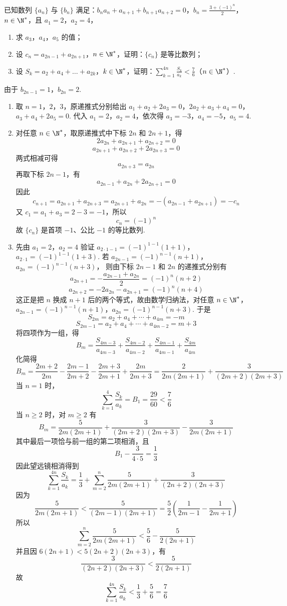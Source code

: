 \begin{problem}
已知数列 \(\{a_n\}\) 与 \(\{b_n\}\) 满足：\(b_na_n+a_{n+1}+b_{n+1}a_{n+2}=0\)，\(b_n=\frac{3+(-1)^n}{2}\)，\(n\in\N^*\)，且 \(a_1=2\)，\(a_2=4\)，
\begin{enumerate}
\item 求 \(a_3\)，\(a_4\)，\(a_5\) 的值；
\item 设 \(c_n=a_{2n-1}+a_{2n+1}\)，\(n\in\N^*\)，证明：\(\{c_n\}\) 是等比数列；
\item 设 \(S_k=a_2+a_4+\dots+a_{2k}\)，\(k\in\N^*\)，证明：\(\sum_{k=1}^{4n}\frac{S_k}{a_k}<\frac76\)（\(n\in\N^*\)）.
\end{enumerate}
\begin{solution}
由于
\(b_{2n-1}=1\)，\(b_{2n}=2\).

\begin{enumerate}
\item 取 \(n=1\)，\(2\)，\(3\)，原递推式分别给出
\(a_1+a_2+2a_3=0\)，\(2a_2+a_3+a_4=0\)，\(a_3+a_4+2a_5=0\).
代入 \(a_1=2\)，\(a_2=4\)，依次得
\(a_3=-3\)，\(a_4=-5\)，\(a_5=4\).

\item 对任意 \(n\in\N^*\)，取原递推式中下标 \(2n\) 和 \(2n+1\)，得
\[
2a_{2n}+a_{2n+1}+a_{2n+2}=0
\]
\[
a_{2n+1}+a_{2n+2}+2a_{2n+3}=0
\]
两式相减可得
\[
a_{2n+3}=a_{2n}
\]
再取下标 \(2n-1\)，有
\[
a_{2n-1}+a_{2n}+2a_{2n+1}=0
\]
因此
\[
c_{n+1}=a_{2n+1}+a_{2n+3}
=a_{2n+1}+a_{2n}
=-(a_{2n-1}+a_{2n+1})
=-c_n
\]
又 \(c_1=a_1+a_3=2-3=-1\)，所以
\[
c_n=(-1)^n
\]
故 \(\{c_n\}\) 是首项 \(-1\)、公比 \(-1\) 的等比数列.

\item 先由 \(a_1=2\)，\(a_2=4\) 验证
\(a_{2\cdot1-1}=(-1)^{1-1}(1+1)\)，\(a_{2\cdot1}=(-1)^{1-1}(1+3)\).
若
\(a_{2n-1}=(-1)^{n-1}(n+1)\)，\(a_{2n}=(-1)^{n-1}(n+3)\)，
则由下标 \(2n-1\) 和 \(2n\) 的递推式分别有
\[
a_{2n+1}=-\frac{a_{2n-1}+a_{2n}}2=(-1)^n(n+2)
\]
\[
a_{2n+2}=-2a_{2n}-a_{2n+1}=(-1)^n(n+4)
\]
这正是把 \(n\) 换成 \(n+1\) 后的两个等式，故由数学归纳法，对任意 \(n\in\N^*\)，
\(a_{2n-1}=(-1)^{n-1}(n+1)\)，\(a_{2n}=(-1)^{n-1}(n+3)\).
于是
\[
S_{2m}=a_2+a_4+\cdots+a_{4m}=-m
\]
\[
S_{2m-1}=a_2+a_4+\cdots+a_{4m-2}=m+3
\]
将四项作为一组，得
\[
B_m=\frac{S_{4m-3}}{a_{4m-3}}
+\frac{S_{4m-2}}{a_{4m-2}}
+\frac{S_{4m-1}}{a_{4m-1}}
+\frac{S_{4m}}{a_{4m}}
\]
化简得
\[
B_m=\frac{2m+2}{2m}
-\frac{2m-1}{2m+2}
-\frac{2m+3}{2m+1}
+\frac{2m}{2m+3}
=\frac{2}{2m(2m+1)}
+\frac{3}{(2m+2)(2m+3)}
\]
当 \(n=1\) 时，
\[
\sum_{k=1}^{4}\frac{S_k}{a_k}
=B_1=\frac{29}{60}<\frac76
\]
当 \(n\geqslant2\) 时，对 \(m\geqslant2\) 有
\[
B_m=\frac5{2m(2m+1)}
+\frac3{(2m+2)(2m+3)}
-\frac3{2m(2m+1)}
\]
其中最后一项恰与前一组的第二项相消，且
\[
B_1-\frac3{4\cdot5}=\frac13
\]
因此望远镜相消得到
\[
\sum_{k=1}^{4n}\frac{S_k}{a_k}
=\frac13+\sum_{m=2}^{n}\frac5{2m(2m+1)}
+\frac3{(2n+2)(2n+3)}
\]
因为
\[
\frac5{2m(2m+1)}
<\frac5{(2m-1)(2m+1)}
=\frac52\left(\frac1{2m-1}-\frac1{2m+1}\right)
\]
所以
\[
\sum_{m=2}^{n}\frac5{2m(2m+1)}
<\frac56-\frac5{2(2n+1)}
\]
并且因 \(6(2n+1)<5(2n+2)(2n+3)\)，有
\[
\frac3{(2n+2)(2n+3)}
<\frac5{2(2n+1)}
\]
故
\[
\sum_{k=1}^{4n}\frac{S_k}{a_k}
<\frac13+\frac56=\frac76
\]
\end{enumerate}
\end{solution}
\end{problem}
